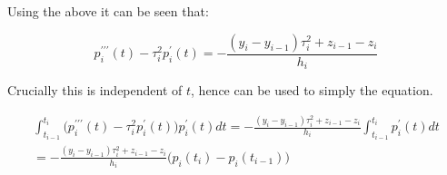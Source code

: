 \documentclass{article}
\begin{document}
Using the above it can be seen that:

\begin{equation}
    p^{\prime\prime\prime}_i(t) - \tau_i^2 p^{\prime}_i(t) =
    - \frac{(y_i - y_{i-1})\tau_i^2 +  z_{i-1} - z_i}{h_i}
\end{equation}

Crucially this is independent of $t$, hence can be used to simply the equation.

\begin{multline}
    \int_{t_{i - 1}}^{t_i} \bigl( p^{\prime\prime\prime}_i(t) - \tau_i^2 p^{\prime}_i(t) \bigr) p^{\prime}_i(t) dt
    = - \frac{(y_i - y_{i-1})\tau_i^2 +  z_{i-1} - z_i}{h_i} \int_{t_{i - 1}}^{t_i} p^{\prime}_i(t) dt \\
    = - \frac{(y_i - y_{i-1})\tau_i^2 +  z_{i-1} - z_i}{h_i} \bigl(p_i(t_i) - p_i(t_{i-1}) \bigr)
\end{multline}
\end{document}
